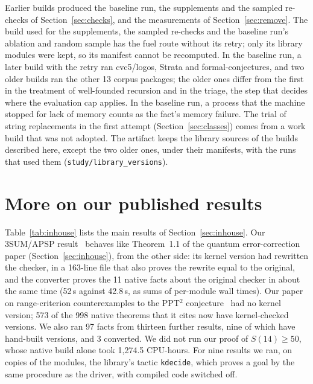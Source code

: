 \documentclass[11pt]{article}
\begin{document}
Earlier builds produced the baseline run, the supplements and the sampled re-checks of
Section~\ref{sec:checks}, and the measurements of Section~\ref{sec:remove}. The build used for the
supplements, the sampled re-checks and the baseline run's ablation and random sample has the fuel route
without its retry; only its library modules were kept, so its manifest cannot be recomputed. In the baseline
run, a later build with the retry ran cvc5/logos, Strata and formal-conjectures, and two older builds ran the
other 13 corpus packages; the older ones differ from the first in the treatment of well-founded recursion and
in the triage, the step that decides where the evaluation cap applies. In the baseline run, a process that the
machine stopped for lack of memory counts as the fact's memory failure. The trial of string replacements in the
first attempt (Section~\ref{sec:classes}) comes from a work build that was not adopted. The artifact keeps the
library sources of the builds described here, except the two older ones, under their manifests, with the runs
that used them (\texttt{study/library\_versions}).

\section{More on our published results}\label{app:inhouse}
Table~\ref{tab:inhouse} lists the main results of Section~\ref{sec:inhouse}. Our 3SUM/APSP result~\cite{fg3sum}
behaves like Theorem~1.1 of the quantum error-correction paper (Section~\ref{sec:inhouse}), from the other side: its kernel version had rewritten the checker, in a
163-line file that also proves the rewrite equal to the original, and the converter proves the 11 native
facts about the original checker in about the same time (52\,s against 42.8\,s, as sums of per-module wall
times). Our paper on range-criterion counterexamples to the PPT\(^2\) conjecture~\cite{ppt2} had no kernel
version; 573 of the 998 native theorems that it cites now have kernel-checked versions. We also ran 97 facts
from thirteen further results, nine of which have hand-built versions, and 3 converted. We did not run our proof
of \(S(14)\ge 50\), whose native build alone took 1,274.5 CPU-hours. For nine results we
ran, on copies of the modules, the library's tactic \texttt{kdecide}, which proves a goal by the same procedure
as the driver, with compiled code switched off.
\end{document}
